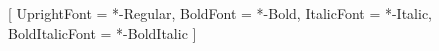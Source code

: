 \usepackage{geometry}
\usepackage{xcolor}
\usepackage{eso-pic}
\usepackage{fancyhdr}
\usepackage{sectsty}
\usepackage{fontspec}
\usepackage{titlesec}


\setmainfont{Source Sans 3}[
  UprightFont    = *-Regular,
  BoldFont       = *-Bold,
  ItalicFont     = *-Italic,
  BoldItalicFont = *-BoldItalic
]

\setsansfont{Roboto Slab}

\setlength{\footskip}{20pt}


\makeatletter
\renewcommand{\maketitle}{\bgroup\setlength{\parindent}{0pt}
\begin{flushleft}
  {\sffamily\huge\textbf{\MakeUppercase{\@title}}} \vspace{0.3cm} \newline
  {\Large {\@subtitle}} \newline
  \@author \newline
  \rule{\textwidth}{1pt}
\end{flushleft}\egroup
}
\makeatother


